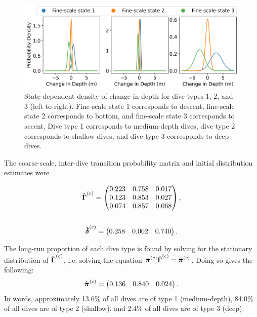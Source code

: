 \documentclass[12pt]{article}
\begin{document}
\begin{figure}[H]
    \centering
    \includegraphics[width=6.5in]{../plt/emission_dists_K_3_3_nWhales_8.png}
    \caption{State-dependent density of change in depth for dive types 1, 2, and 3 (left to right). Fine-scale state 1 corresponds to descent, fine-scale state 2 corresponds to bottom, and fine-scale state 3 corresponds to ascent. Dive type 1 corresponds to medium-depth dives, dive type 2 corresponds to shallow dives, and dive type 3 corresponds to deep dives.}
    \label{fig:emission_dist}
\end{figure}

The coarse-scale, inter-dive transition probability matrix and initial distribution estimates were 

\begin{gather}
    \hat {\boldsymbol{\Gamma}}^{(c)} = 
    \begin{pmatrix} 
    0.223 & 0.758 & 0.017 \\
    0.123 & 0.853 & 0.027 \\
    0.074 & 0.857 & 0.068
    \end{pmatrix}, \\ \nonumber \\
    \hat {\boldsymbol{\delta}}^{(c)} = \begin{pmatrix} 0.258 & 0.002 & 0.740 \end{pmatrix}.
\end{gather}

The long-run proportion of each dive type is found by solving for the stationary distribution of $\hat {\boldsymbol{\Gamma}}^{(c)}$, i.e. solving the equation $\hat {\boldsymbol{\pi}}^{(c)} \hat {\boldsymbol{\Gamma}}^{(c)} = \hat {\boldsymbol{\pi}}^{(c)}$. Doing so gives the following:
%
\begin{equation}
    \hat {\boldsymbol{\pi}}^{(c)} = 
    \begin{pmatrix}
        0.136 & 0.840 & 0.024
    \end{pmatrix}.
\end{equation}
%
In words, approximately 13.6\% of all dives are of type 1 (medium-depth), 84.0\% of all dives are of type 2 (shallow), and 2.4\% of all dives are of type 3 (deep).
\end{document}
